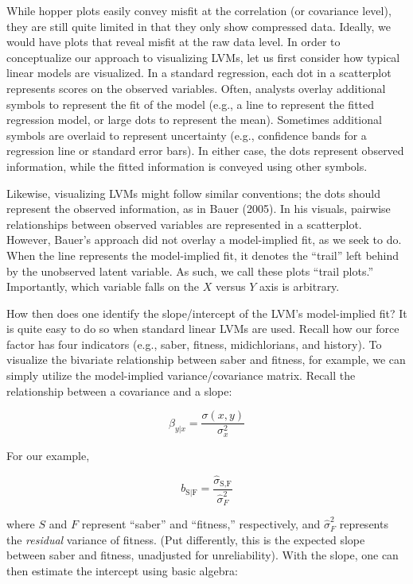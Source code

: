 \documentclass[
  english,
  man]{apa6}
\begin{document}
While hopper plots easily convey misfit at the correlation (or covariance level), they are still quite limited in that they only show compressed data. Ideally, we would have plots that reveal misfit at the raw data level. In order to conceptualize our approach to visualizing LVMs, let us first consider how typical linear models are visualized. In a standard regression, each dot in a scatterplot represents scores on the observed variables. Often, analysts overlay additional symbols to represent the fit of the model (e.g., a line to represent the fitted regression model, or large dots to represent the mean). Sometimes additional symbols are overlaid to represent uncertainty (e.g., confidence bands for a regression line or standard error bars). In either case, the dots represent observed information, while the fitted information is conveyed using other symbols.

Likewise, visualizing LVMs might follow similar conventions; the dots should represent the observed information, as in Bauer (2005). In his visuals, pairwise relationships between observed variables are represented in a scatterplot. However, Bauer's approach did not overlay a model-implied fit, as we seek to do. When the line represents the model-implied fit, it denotes the ``trail'' left behind by the unobserved latent variable. As such, we call these plots ``trail plots.'' Importantly, which variable falls on the \(X\) versus \(Y\) axis is arbitrary.

How then does one identify the slope/intercept of the LVM's model-implied fit? It is quite easy to do so when standard linear LVMs are used. Recall how our force factor has four indicators (e.g., saber, fitness, midichlorians, and history). To visualize the bivariate relationship between saber and fitness, for example, we can simply utilize the model-implied variance/covariance matrix. Recall the relationship between a covariance and a slope:

\[\beta_{y|x} = \frac{\sigma(x,y)}{\sigma^2_x}\]

For our example,

\[b_{\text{S}|\text{F}} = \frac{\hat{\sigma}_{\text{S},\text{F}}}{\hat{\sigma}^2_F}\]

\noindent where \(S\) and \(F\) represent ``saber'' and ``fitness,'' respectively, and \({\hat{\sigma}^2_F}\) represents the \emph{residual} variance of fitness. (Put differently, this is the expected slope between saber and fitness, unadjusted for unreliability). With the slope, one can then estimate the intercept using basic algebra:
\end{document}
